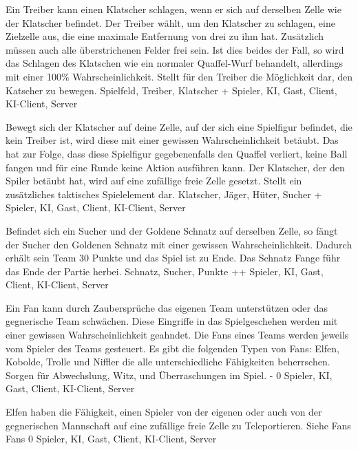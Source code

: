         {Ein Treiber kann einen Klatscher schlagen, wenn er sich auf derselben Zelle wie der Klatscher befindet. Der Treiber wählt, um den Klatscher zu schlagen, eine Zielzelle aus, die eine maximale Entfernung von drei zu ihm hat. Zusätzlich müssen auch alle überstrichenen Felder frei sein. Ist dies beides der Fall, so wird das Schlagen des Klatschen wie ein normaler Quaffel-Wurf behandelt, allerdings mit einer 100\% Wahrscheinlichkeit.}
        {Stellt für den Treiber die Möglichkeit dar, den Katscher zu bewegen.}
        {Spielfeld, Treiber, Klatscher}
        {+}
        {Spieler, KI, Gast, Client, KI-Client, Server}
        
        {Bewegt sich der Klatscher auf deine Zelle, auf der sich eine Spielfigur befindet, die kein Treiber ist, wird diese mit einer gewissen Wahrscheinlichkeit betäubt. Das hat zur Folge, dass diese Spielfigur gegebenenfalls den Quaffel verliert, keine Ball fangen und für eine Runde keine Aktion ausführen kann. Der Klatscher, der den Spiler betäubt hat, wird auf eine zufällige freie Zelle gesetzt.}
        {Stellt ein zusätzliches taktisches Spielelement dar.}
        {Klatscher, Jäger, Hüter, Sucher}
        {+}
        {Spieler, KI, Gast, Client, KI-Client, Server}
        
        {Befindet sich ein Sucher und der Goldene Schnatz auf derselben Zelle, so fängt der Sucher den Goldenen Schnatz mit einer gewissen Wahrscheinlichkeit. Dadurch erhält sein Team 30 Punkte und das Spiel ist zu Ende.}
        {Das Schnatz Fange führ das Ende der Partie herbei.}
        {Schnatz, Sucher, Punkte}
        {++}
        {Spieler, KI, Gast, Client, KI-Client, Server}
        

        {Ein Fan kann durch Zaubersprüche das eigenen Team unterstützen oder das gegnerische Team schwächen. Diese Eingriffe in das Spielgeschehen werden  mit einer gewissen Wahrscheinlichkeit geahndet. Die Fans eines Teams werden jeweils vom Spieler des Teams gesteuert. Es gibt die folgenden Typen von Fans: Elfen, Kobolde, Trolle und Niffler die alle unterschiedliche Fähigkeiten beherrschen.}
        {Sorgen für Abwechslung, Witz, und Überraschungen im Spiel.}
        {-}
        {0}
        {Spieler, KI, Gast, Client, KI-Client, Server}

        {Elfen haben die Fähigkeit, einen Spieler von der eigenen oder auch von der gegnerischen Mannschaft auf eine zufällige freie Zelle zu Teleportieren.}
        {Siehe Fans}
        {Fans}
        {0}
        {Spieler, KI, Gast, Client, KI-Client, Server}

